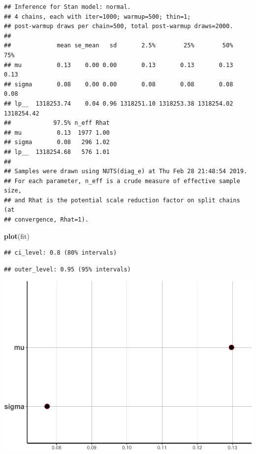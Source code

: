 \documentclass[]{article}
\newenvironment{Shaded}{\begin{snugshade}}{\end{snugshade}}
\newcommand{\KeywordTok}[1]{\textcolor[rgb]{0.13,0.29,0.53}{\textbf{#1}}}
\newcommand{\NormalTok}[1]{#1}
\begin{document}
\begin{verbatim}
## Inference for Stan model: normal.
## 4 chains, each with iter=1000; warmup=500; thin=1; 
## post-warmup draws per chain=500, total post-warmup draws=2000.
## 
##             mean se_mean   sd       2.5%        25%        50%        75%
## mu          0.13    0.00 0.00       0.13       0.13       0.13       0.13
## sigma       0.08    0.00 0.00       0.08       0.08       0.08       0.08
## lp__  1318253.74    0.04 0.96 1318251.10 1318253.38 1318254.02 1318254.42
##            97.5% n_eff Rhat
## mu          0.13  1977 1.00
## sigma       0.08   296 1.02
## lp__  1318254.68   576 1.01
## 
## Samples were drawn using NUTS(diag_e) at Thu Feb 28 21:48:54 2019.
## For each parameter, n_eff is a crude measure of effective sample size,
## and Rhat is the potential scale reduction factor on split chains (at 
## convergence, Rhat=1).
\end{verbatim}

\begin{Shaded}
\begin{Highlighting}[]
\KeywordTok{plot}\NormalTok{(fit)}
\end{Highlighting}
\end{Shaded}

\begin{verbatim}
## ci_level: 0.8 (80% intervals)
\end{verbatim}

\begin{verbatim}
## outer_level: 0.95 (95% intervals)
\end{verbatim}

\includegraphics{20190225_bayes_MCMC_Metropolis_files/figure-latex/unnamed-chunk-15-1.pdf}
\end{document}
